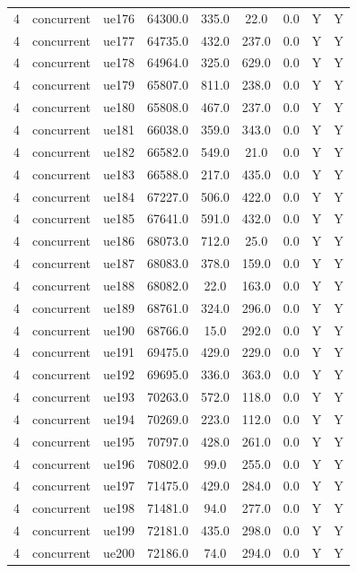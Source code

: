 \begin{table}[ht]
\begin{tabular}{|c|c|c|c|c|c|c|c|c|}
4 & concurrent & ue176 & 64300.0 & 335.0 & 22.0 & 0.0 & Y & Y \\
4 & concurrent & ue177 & 64735.0 & 432.0 & 237.0 & 0.0 & Y & Y \\
4 & concurrent & ue178 & 64964.0 & 325.0 & 629.0 & 0.0 & Y & Y \\
4 & concurrent & ue179 & 65807.0 & 811.0 & 238.0 & 0.0 & Y & Y \\
4 & concurrent & ue180 & 65808.0 & 467.0 & 237.0 & 0.0 & Y & Y \\
4 & concurrent & ue181 & 66038.0 & 359.0 & 343.0 & 0.0 & Y & Y \\
4 & concurrent & ue182 & 66582.0 & 549.0 & 21.0 & 0.0 & Y & Y \\
4 & concurrent & ue183 & 66588.0 & 217.0 & 435.0 & 0.0 & Y & Y \\
4 & concurrent & ue184 & 67227.0 & 506.0 & 422.0 & 0.0 & Y & Y \\
4 & concurrent & ue185 & 67641.0 & 591.0 & 432.0 & 0.0 & Y & Y \\
4 & concurrent & ue186 & 68073.0 & 712.0 & 25.0 & 0.0 & Y & Y \\
4 & concurrent & ue187 & 68083.0 & 378.0 & 159.0 & 0.0 & Y & Y \\
4 & concurrent & ue188 & 68082.0 & 22.0 & 163.0 & 0.0 & Y & Y \\
4 & concurrent & ue189 & 68761.0 & 324.0 & 296.0 & 0.0 & Y & Y \\
4 & concurrent & ue190 & 68766.0 & 15.0 & 292.0 & 0.0 & Y & Y \\
4 & concurrent & ue191 & 69475.0 & 429.0 & 229.0 & 0.0 & Y & Y \\
4 & concurrent & ue192 & 69695.0 & 336.0 & 363.0 & 0.0 & Y & Y \\
4 & concurrent & ue193 & 70263.0 & 572.0 & 118.0 & 0.0 & Y & Y \\
4 & concurrent & ue194 & 70269.0 & 223.0 & 112.0 & 0.0 & Y & Y \\
4 & concurrent & ue195 & 70797.0 & 428.0 & 261.0 & 0.0 & Y & Y \\
4 & concurrent & ue196 & 70802.0 & 99.0 & 255.0 & 0.0 & Y & Y \\
4 & concurrent & ue197 & 71475.0 & 429.0 & 284.0 & 0.0 & Y & Y \\
4 & concurrent & ue198 & 71481.0 & 94.0 & 277.0 & 0.0 & Y & Y \\
4 & concurrent & ue199 & 72181.0 & 435.0 & 298.0 & 0.0 & Y & Y \\
4 & concurrent & ue200 & 72186.0 & 74.0 & 294.0 & 0.0 & Y & Y \\

\end{tabular}
\end{table}
